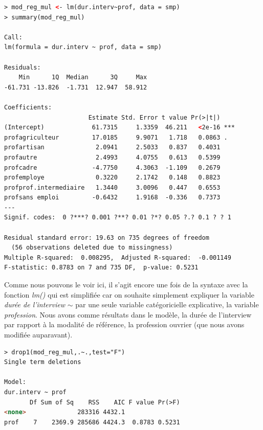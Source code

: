 \begin{lstlisting}[language=html]
> mod_reg_mul <- lm(dur.interv~prof, data = smp)
> summary(mod_reg_mul)

Call:
lm(formula = dur.interv ~ prof, data = smp)

Residuals:
    Min      1Q  Median      3Q     Max 
-61.731 -13.826  -1.731  12.947  58.912 

Coefficients:
                       Estimate Std. Error t value Pr(>|t|)    
(Intercept)             61.7315     1.3359  46.211   <2e-16 ***
profagriculteur         17.0185     9.9071   1.718   0.0863 .  
profartisan              2.0941     2.5033   0.837   0.4031    
profautre                2.4993     4.0755   0.613   0.5399    
profcadre               -4.7750     4.3063  -1.109   0.2679    
profemploye              0.3220     2.1742   0.148   0.8823    
profprof.intermediaire   1.3440     3.0096   0.447   0.6553    
profsans emploi         -0.6432     1.9168  -0.336   0.7373    
---
Signif. codes:  0 ?***? 0.001 ?**? 0.01 ?*? 0.05 ?.? 0.1 ? ? 1

Residual standard error: 19.63 on 735 degrees of freedom
  (56 observations deleted due to missingness)
Multiple R-squared:  0.008295,	Adjusted R-squared:  -0.001149 
F-statistic: 0.8783 on 7 and 735 DF,  p-value: 0.5231

\end{lstlisting}
Comme nous pouvons le voir ici, il s'agit encore une fois de la syntaxe avec la fonction \textit{lm()} qui est simplifiée car on souhaite simplement expliquer la variable \textit{durée de l'interview} $\sim$ par une seule variable catégoricielle explicative, la variable \textit{profession}.\newline
Nous avons comme résultats dans le modèle, la durée de l'interview par rapport à la modalité de référence, la profession ouvrier (que nous avons modifiée auparavant).\newline

\begin{lstlisting}[language=html]
> drop1(mod_reg_mul,.~.,test="F")
Single term deletions

Model:
dur.interv ~ prof
       Df Sum of Sq    RSS    AIC F value Pr(>F)
<none>              283316 4432.1               
prof    7    2369.9 285686 4424.3  0.8783 0.5231
\end{lstlisting}


